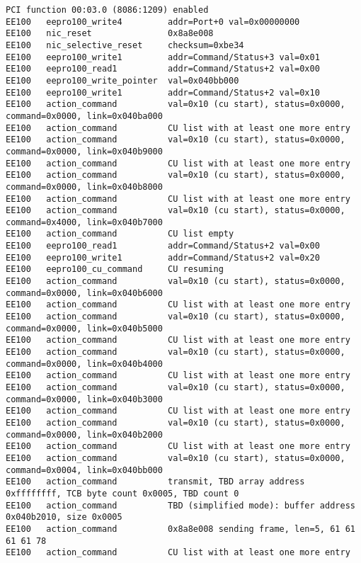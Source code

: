 \documentclass{article}
\begin{document}
\begin{CJK*}{UTF8}{gkai}
\begin{lstlisting}[style=console, basicstyle=\tiny\color{green}\ttfamily\bfseries]
PCI function 00:03.0 (8086:1209) enabled
EE100	eepro100_write4         addr=Port+0 val=0x00000000
EE100	nic_reset               0x8a8e008
EE100	nic_selective_reset     checksum=0xbe34
EE100	eepro100_write1         addr=Command/Status+3 val=0x01
EE100	eepro100_read1          addr=Command/Status+2 val=0x00
EE100	eepro100_write_pointer  val=0x040bb000
EE100	eepro100_write1         addr=Command/Status+2 val=0x10
EE100	action_command          val=0x10 (cu start), status=0x0000, command=0x0000, link=0x040ba000
EE100	action_command          CU list with at least one more entry
EE100	action_command          val=0x10 (cu start), status=0x0000, command=0x0000, link=0x040b9000
EE100	action_command          CU list with at least one more entry
EE100	action_command          val=0x10 (cu start), status=0x0000, command=0x0000, link=0x040b8000
EE100	action_command          CU list with at least one more entry
EE100	action_command          val=0x10 (cu start), status=0x0000, command=0x4000, link=0x040b7000
EE100	action_command          CU list empty
EE100	eepro100_read1          addr=Command/Status+2 val=0x00
EE100	eepro100_write1         addr=Command/Status+2 val=0x20
EE100	eepro100_cu_command     CU resuming
EE100	action_command          val=0x10 (cu start), status=0x0000, command=0x0000, link=0x040b6000
EE100	action_command          CU list with at least one more entry
EE100	action_command          val=0x10 (cu start), status=0x0000, command=0x0000, link=0x040b5000
EE100	action_command          CU list with at least one more entry
EE100	action_command          val=0x10 (cu start), status=0x0000, command=0x0000, link=0x040b4000
EE100	action_command          CU list with at least one more entry
EE100	action_command          val=0x10 (cu start), status=0x0000, command=0x0000, link=0x040b3000
EE100	action_command          CU list with at least one more entry
EE100	action_command          val=0x10 (cu start), status=0x0000, command=0x0000, link=0x040b2000
EE100	action_command          CU list with at least one more entry
EE100	action_command          val=0x10 (cu start), status=0x0000, command=0x0004, link=0x040bb000
EE100	action_command          transmit, TBD array address 0xffffffff, TCB byte count 0x0005, TBD count 0
EE100	action_command          TBD (simplified mode): buffer address 0x040b2010, size 0x0005
EE100	action_command          0x8a8e008 sending frame, len=5, 61 61 61 61 78
EE100	action_command          CU list with at least one more entry

\end{lstlisting}
\end{CJK*}
\end{document}
